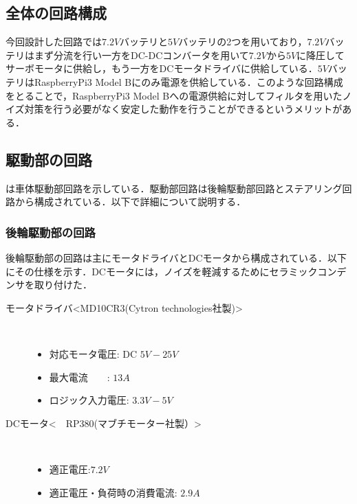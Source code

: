 \subsection{全体の回路構成}

今回設計した回路では$7.2\unit{V}$バッテリと$5\unit{V}$バッテリの2つを用いており，$7.2\unit{V}$バッテリはまず分流を行い一方をDC-DCコンバータを用いて$7.2\unit{V}$から$5\unit{V}$に降圧してサーボモータに供給し，もう一方をDCモータドライバに供給している．$5\unit{V}$バッテリはRaspberryPi3 Model Bにのみ電源を供給している．このような回路構成をとることで，RaspberryPi3 Model Bへの電源供給に対してフィルタを用いたノイズ対策を行う必要がなく安定した動作を行うことができるというメリットがある\cite{motor}．


\subsection{駆動部の回路}
は車体駆動部回路を示している．駆動部回路は後輪駆動部回路とステアリング回路から構成されている．以下で詳細について説明する．


\subsubsection{後輪駆動部の回路}
後輪駆動部の回路は主にモータドライバとDCモータから構成されている．以下にその仕様を示す．DCモータには，ノイズを軽減するためにセラミックコンデンサを取り付けた\cite{motor}．
\begin{description}
    \item[モータドライバ\textless MD10CR3(Cytron technologies社製)\textgreater \cite{motordriver}]\mbox{}\\
    \vspace{-5mm}
        \begin{itemize}
            \item 対応モータ電圧: DC $5\unit{V}-25\unit{V}$
            \item 最大電流　　: $13\unit{A}$
            \item ロジック入力電圧: $3.3\unit{V}-5\unit{V}$
        \end{itemize}
     \item[DCモータ\textless　RP380(マブチモーター社製）\textgreater\cite{R380}]\mbox{}\\
     \vspace{-5mm}
         \begin{itemize}
            \item 適正電圧:$7.2\unit{V}$
            \item 適正電圧・負荷時の消費電流: $2.9\unit{A}$
        \end{itemize}
\end{description}

